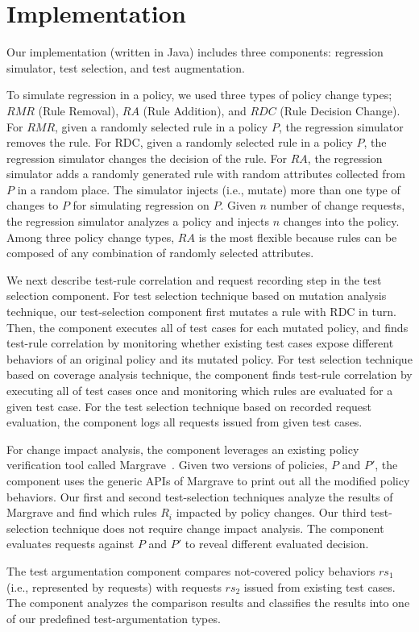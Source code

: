 \section{Implementation} \label{sec:implementation}

Our implementation (written in Java) includes three components: regression simulator, test selection,
and test augmentation.

To simulate regression in a policy, 
we used three types of policy change types; $RMR$ (Rule Removal), $RA$ (Rule Addition), and $RDC$ (Rule Decision Change). For $RMR$, given a randomly selected rule in a policy $P$,
the regression simulator removes the rule. For RDC,
given a randomly selected rule in a policy $P$, the regression simulator changes
the decision of the rule.
For $RA$, the regression simulator adds a randomly generated
rule with random attributes collected from $P$ in a random place.
The simulator injects (i.e., mutate) more than one type of changes to $P$ for simulating
regression on $P$.
Given $n$ number of change requests, the regression simulator analyzes a policy and injects $n$ changes
into the policy. Among three policy change types, $RA$ is the most flexible
because rules can be composed of any combination of randomly selected attributes.

We next describe test-rule correlation and request recording step in the test selection
component. 
For test selection technique based on mutation analysis technique,
our test-selection component first mutates a rule with RDC in turn.
Then, the component executes all of test cases for each mutated policy, and
finds test-rule correlation by monitoring 
whether existing test cases expose different behaviors of an original policy and its mutated policy.
For test selection technique based on coverage analysis technique,
the component finds test-rule correlation by executing all of test cases once and monitoring
which rules are evaluated for a given test case.
For the test selection technique based on recorded request evaluation,
the component logs all requests issued from given test cases.

For change impact analysis, the component leverages an existing policy verification tool called Margrave~\cite{fisler05:verification}. 
Given two versions of policies, $P$ and $P'$, 
the component uses the generic APIs of Margrave to
print out all the modified policy behaviors.
Our first and second test-selection techniques analyze the results of Margrave and
find which rules $R_i$ impacted by policy changes.
Our third test-selection technique does not require change impact analysis. The
component evaluates requests against $P$ and $P'$ to reveal different evaluated decision.

The test argumentation component compares
not-covered policy behaviors $rs_1$ (i.e., represented by requests) with requests $rs_2$ issued
from existing test cases. The component analyzes the comparison results and classifies
the results into one of our predefined test-argumentation types. 
 



